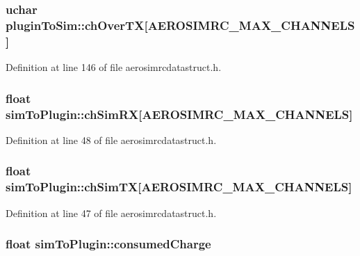 \hypertarget{group___aero_sim_r_c_ga77e9265e0ad99dcc6a7c5cc35da0481d}{
\subsubsection[{ch\-Over\-T\-X}]{\setlength{\rightskip}{0pt plus 5cm}uchar {\bf plugin\-To\-Sim\-::ch\-Over\-T\-X}\mbox{[}{\bf \-A\-E\-R\-O\-S\-I\-M\-R\-C\-\_\-\-M\-A\-X\-\_\-\-C\-H\-A\-N\-N\-E\-L\-S}\mbox{]}}}\label{group___aero_sim_r_c_ga77e9265e0ad99dcc6a7c5cc35da0481d}


\-Definition at line 146 of file aerosimrcdatastruct.\-h.

\hypertarget{group___aero_sim_r_c_gadefc3aa551adb807da0171a7a92f73ee}{
\subsubsection[{ch\-Sim\-R\-X}]{\setlength{\rightskip}{0pt plus 5cm}float {\bf sim\-To\-Plugin\-::ch\-Sim\-R\-X}\mbox{[}{\bf \-A\-E\-R\-O\-S\-I\-M\-R\-C\-\_\-\-M\-A\-X\-\_\-\-C\-H\-A\-N\-N\-E\-L\-S}\mbox{]}}}\label{group___aero_sim_r_c_gadefc3aa551adb807da0171a7a92f73ee}


\-Definition at line 48 of file aerosimrcdatastruct.\-h.

\hypertarget{group___aero_sim_r_c_gae5ff2433affe60bce670d0c6bf66ee06}{
\subsubsection[{ch\-Sim\-T\-X}]{\setlength{\rightskip}{0pt plus 5cm}float {\bf sim\-To\-Plugin\-::ch\-Sim\-T\-X}\mbox{[}{\bf \-A\-E\-R\-O\-S\-I\-M\-R\-C\-\_\-\-M\-A\-X\-\_\-\-C\-H\-A\-N\-N\-E\-L\-S}\mbox{]}}}\label{group___aero_sim_r_c_gae5ff2433affe60bce670d0c6bf66ee06}


\-Definition at line 47 of file aerosimrcdatastruct.\-h.

\hypertarget{group___aero_sim_r_c_ga408ab8a806126f8c39a224202f7784c9}{
\subsubsection[{consumed\-Charge}]{\setlength{\rightskip}{0pt plus 5cm}float {\bf sim\-To\-Plugin\-::consumed\-Charge}}}\label{group___aero_sim_r_c_ga408ab8a806126f8c39a224202f7784c9}


